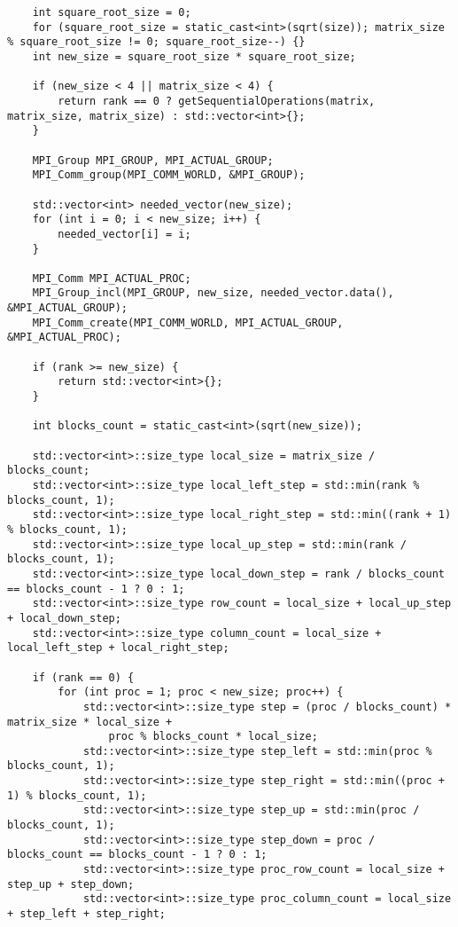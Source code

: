 \documentclass{report}
\begin{document}
\begin{lstlisting}
    int square_root_size = 0;
    for (square_root_size = static_cast<int>(sqrt(size)); matrix_size % square_root_size != 0; square_root_size--) {}
    int new_size = square_root_size * square_root_size;

    if (new_size < 4 || matrix_size < 4) {
        return rank == 0 ? getSequentialOperations(matrix, matrix_size, matrix_size) : std::vector<int>{};
    }

    MPI_Group MPI_GROUP, MPI_ACTUAL_GROUP;
    MPI_Comm_group(MPI_COMM_WORLD, &MPI_GROUP);

    std::vector<int> needed_vector(new_size);
    for (int i = 0; i < new_size; i++) {
        needed_vector[i] = i;
    }

    MPI_Comm MPI_ACTUAL_PROC;
    MPI_Group_incl(MPI_GROUP, new_size, needed_vector.data(), &MPI_ACTUAL_GROUP);
    MPI_Comm_create(MPI_COMM_WORLD, MPI_ACTUAL_GROUP, &MPI_ACTUAL_PROC);

    if (rank >= new_size) {
        return std::vector<int>{};
    }

    int blocks_count = static_cast<int>(sqrt(new_size));

    std::vector<int>::size_type local_size = matrix_size / blocks_count;
    std::vector<int>::size_type local_left_step = std::min(rank % blocks_count, 1);
    std::vector<int>::size_type local_right_step = std::min((rank + 1) % blocks_count, 1);
    std::vector<int>::size_type local_up_step = std::min(rank / blocks_count, 1);
    std::vector<int>::size_type local_down_step = rank / blocks_count == blocks_count - 1 ? 0 : 1;
    std::vector<int>::size_type row_count = local_size + local_up_step + local_down_step;
    std::vector<int>::size_type column_count = local_size + local_left_step + local_right_step;

    if (rank == 0) {
        for (int proc = 1; proc < new_size; proc++) {
            std::vector<int>::size_type step = (proc / blocks_count) * matrix_size * local_size +
                proc % blocks_count * local_size;
            std::vector<int>::size_type step_left = std::min(proc % blocks_count, 1);
            std::vector<int>::size_type step_right = std::min((proc + 1) % blocks_count, 1);
            std::vector<int>::size_type step_up = std::min(proc / blocks_count, 1);
            std::vector<int>::size_type step_down = proc / blocks_count == blocks_count - 1 ? 0 : 1;
            std::vector<int>::size_type proc_row_count = local_size + step_up + step_down;
            std::vector<int>::size_type proc_column_count = local_size + step_left + step_right;


\end{lstlisting}
\end{document}
